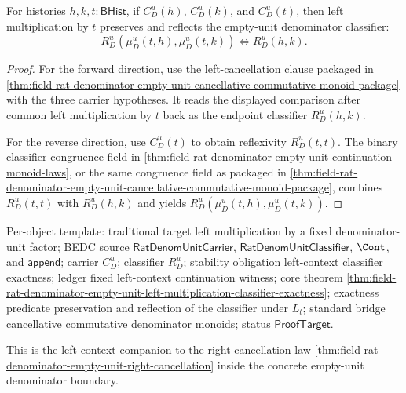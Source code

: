 \begin{theorem}
\label{thm:field-rat-denominator-empty-unit-left-multiplication-classifier-exactness}
For histories $h,k,t:\mathsf{BHist}$, if $C_D^u(h)$, $C_D^u(k)$, and
$C_D^u(t)$, then left multiplication by $t$ preserves and reflects the
empty-unit denominator classifier:
$$
R_D^u(\mu_D^u(t,h),\mu_D^u(t,k)) \Longleftrightarrow R_D^u(h,k).
$$
\end{theorem}
\begin{proof}
For the forward direction, use the left-cancellation clause packaged in
\autoref{thm:field-rat-denominator-empty-unit-cancellative-commutative-monoid-package}
with the three carrier hypotheses. It reads the displayed comparison after
common left multiplication by $t$ back as the endpoint classifier $R_D^u(h,k)$.

For the reverse direction, use $C_D^u(t)$ to obtain reflexivity
$R_D^u(t,t)$. The binary classifier congruence field in
\autoref{thm:field-rat-denominator-empty-unit-continuation-monoid-laws}, or the
same congruence field as packaged in
\autoref{thm:field-rat-denominator-empty-unit-cancellative-commutative-monoid-package},
combines $R_D^u(t,t)$ with $R_D^u(h,k)$ and yields
$R_D^u(\mu_D^u(t,h),\mu_D^u(t,k))$.
\end{proof}

Per-object template: traditional target left multiplication by a fixed
denominator-unit factor; BEDC source $\mathsf{RatDenomUnitCarrier}$,
$\mathsf{RatDenomUnitClassifier}$, $\Cont$, and $\mathsf{append}$; carrier
$C_D^u$; classifier $R_D^u$; stability obligation left-context classifier
exactness; ledger fixed left-context continuation witness; core theorem
\autoref{thm:field-rat-denominator-empty-unit-left-multiplication-classifier-exactness};
exactness predicate preservation and reflection of the classifier under $L_t$;
standard bridge cancellative commutative denominator monoids; status
$\mathsf{ProofTarget}$.

This is the left-context companion to the right-cancellation law
\autoref{thm:field-rat-denominator-empty-unit-right-cancellation} inside the
concrete empty-unit denominator boundary.

